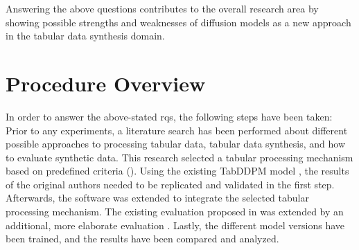 Answering the above questions contributes to the overall research area by showing possible strengths and weaknesses of diffusion models
as a new approach in the tabular data synthesis domain.

\section{Procedure Overview}
\label{ch:intro-proceeding}
In order to answer the above-stated \glspl{rq}, the following steps have been taken:
Prior to any experiments, a literature search has been performed about different possible approaches to processing tabular data, tabular data synthesis, and how to evaluate synthetic data.
This research selected a tabular processing mechanism based on predefined criteria ().
Using the existing TabDDPM model \cite{kotelnikov2022TabDDPMModellingTabular}, the results of the original authors needed to be replicated and validated in the first step.
Afterwards, the software was extended to integrate the selected tabular processing mechanism.
The existing evaluation proposed in \cite{kotelnikov2022TabDDPMModellingTabular} was extended by an additional, more elaborate evaluation \cite{akim2023TabDDPMModellingTabular}.
Lastly, the different model versions have been trained, and the results have been compared and analyzed.

